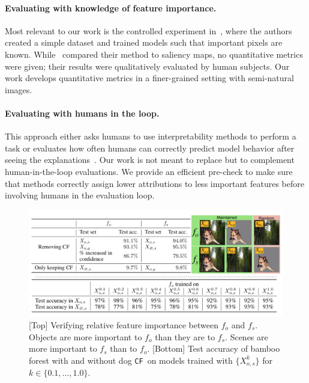 \documentclass[twoside]{article}
\newcommand{\CF}{\texttt{CF}}
\begin{document}
\paragraph{Evaluating with knowledge of feature importance.}
Most relevant to our work is the controlled experiment in~\citet{Kim18}, where the authors created a simple dataset and trained models such that important pixels are known. While~\citet{Kim18} compared their method to saliency maps, no quantitative metrics were given; their results were qualitatively evaluated by human subjects. Our work develops quantitative metrics in a finer-grained setting with semi-natural images.

\paragraph{Evaluating with humans in the loop.} This approach either asks humans to use interpretability methods to perform a task or evaluates how often humans can correctly predict model behavior after seeing the explanations~\citep{Lakkaraju16, Ribeiro16, Doshi17, Lage18, Narayanan18, Poursabzi18}. Our work is not meant to replace but to complement human-in-the-loop evaluations. We provide an efficient pre-check to make sure that methods correctly assign lower attributions to less important features before involving humans in the evaluation loop.

\begin{figure}[ht]
\centering
  \centering
  \includegraphics[width=.9\linewidth]{figures/dataset_gray_table_relative.jpg}
\caption{[Top] Verifying relative feature importance between $f_o$ and $f_s$. Objects are more important to $f_o$ than they are to $f_s$. Scenes are more important to $f_s$ than to $f_o$. [Bottom] Test accuracy of bamboo forest with and without dog \CF~on models trained with $\{X_{o,s}^k\}$ for $k \in \{0.1, \dots, 1.0\}$.}
  \label{fig:dataset_gray_table:dataset_acc} 
\end{figure}
\end{document}
